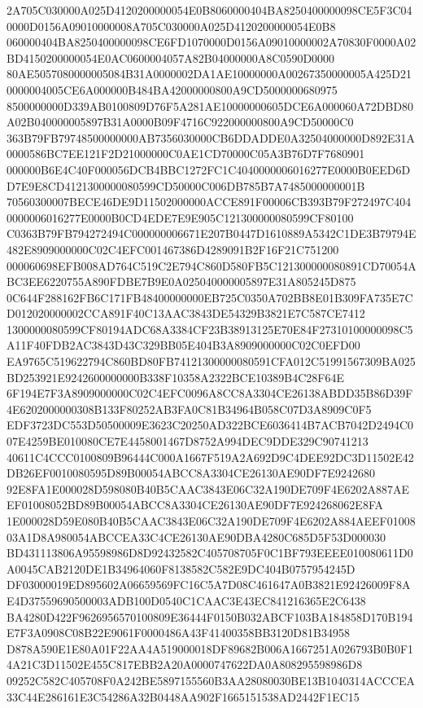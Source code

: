 \documentclass[UTF8,fontset=fandol,zihao=-4,a4paper]{ctexart}
\begin{document}
{{2A705C030000A025D4120200000054E0B8060000404BA8250400000098CE5F3C040000D0156A09010000008A705C030000A025D4120200000054E0B8
060000404BA8250400000098CE6FD1070000D0156A09010000002A70830F0000A02BD4150200000054E0AC0600004057A82B04000000A8C0590D0000
80AE5057080000005084B31A0000002DA1AE10000000A00267350000005A425D210000004005CE6A000000B484BA42000000800A9CD5000000680975
8500000000D339AB0100809D76F5A281AE10000000605DCE6A000060A72DBD80A02B040000005897B31A0000B09F4716C922000000800A9CD50000C0
363B79FB79748500000000AB7356030000CB6DDADDE0A32504000000D892E31A0000586BC7EE121F2D21000000C0AE1CD70000C05A3B76D7F7680901
000000B6E4C40F000056DCB4BBC1272FC1C4040000006016277E0000B0EED6DD7E9E8CD4121300000080599CD50000C006DB785B7A7485000000001B
70560300007BECE46DE9D11502000000ACCE891F00006CB393B79F272497C4040000006016277E0000B0CD4EDE7E9E905C121300000080599CF80100
C0363B79FB794272494C000000006671E207B0447D1610889A5342C1DE3B79794E482E8909000000C02C4EFC001467386D4289091B2F16F21C751200
000060698EFB008AD764C519C2E794C860D580FB5C121300000080891CD70054ABC3EE6220755A890FDBE7B9E0A025040000005897E31A805245D875
0C644F288162FB6C171FB48400000000EB725C0350A702BB8E01B309FA735E7CD012020000002CCA891F40C13AAC3843DE54329B3821E7C587CE7412
1300000080599CF80194ADC68A3384CF23B38913125E70E84F27310100000098C5A11F40FDB2AC3843D43C329BB05E404B3A8909000000C02C0EFD00
EA9765C519622794C860BD80FB74121300000080591CFA012C51991567309BA025BD253921E9242600000000B338F10358A2322BCE10389B4C28F64E
6F194E7F3A8909000000C02C4EFC0096A8CC8A3304CE26138ABDD35B86D39F4E6202000000308B133F80252AB3FA0C81B34964B058C07D3A8909C0F5
EDF3723DC553D50500009E3623C20250AD322BCE6036414B7ACB7042D2494C007E4259BE010080CE7E4458001467D8752A994DEC9DDE329C90741213
40611C4CCC0100809B96444C000A1667F519A2A692D9C4DEE92DC3D11502E42DB26EF0010080595D89B00054ABCC8A3304CE26130AE90DF7E9242680
92E8FA1E000028D598080B40B5CAAC3843E06C32A190DE709F4E6202A887AEEF01008052BD89B00054ABCC8A3304CE26130AE90DF7E924268062E8FA
1E000028D59E080B40B5CAAC3843E06C32A190DE709F4E6202A884AEEF0100803A1D8A980054ABCCEA33C4CE26130AE90DBA4280C685D5F53D000030
BD431113806A95598986D8D92432582C405708705F0C1BF793EEEE010080611D0A0045CAB2120DE1B34964060F8138582C582E9DC404B0757954245D
DF03000019ED895602A06659569FC16C5A7D08C461647A0B3821E92426009F8AE4D37559690500003ADB100D0540C1CAAC3E43EC841216365E2C6438
BA4280D422F9626956570100809E36444F0150B032ABCF103BA184858D170B194E7F3A0908C08B22E9061F0000486A43F41400358BB3120D81B34958
D878A590E1E80A01F22AA4A519000018DF89682B006A1667251A026793B0B0F14A21C3D11502E455C817EBB2A20A0000747622DA0A808295598986D8
09252C582C405708F0A242BE5897155560B3AA28080030BE13B1040314ACCCEA33C44E286161E3C54286A32B0448AA902F1665151538AD2442F1EC15
}}
\end{document}
